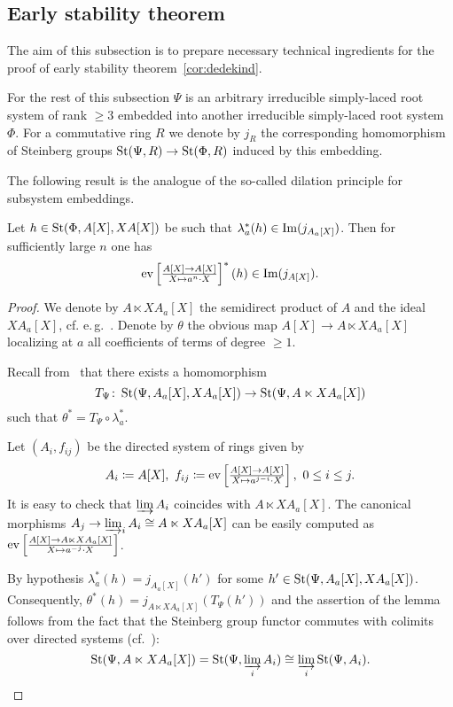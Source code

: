 \subsection{Early stability theorem}
The aim of this subsection is to prepare necessary technical ingredients for the proof of early stability theorem~\cref{cor:dedekind}.

For the rest of this subsection $\Psi$ is an arbitrary irreducible simply-laced root system of rank $\geq 3$ embedded into another irreducible simply-laced root system $\Phi$.
For a commutative ring $R$ we denote by $j_R$ the corresponding homomorphism of Steinberg groups $\operatorname{St}(\Psi, R) \to \operatorname{St}(\Phi, R)$ induced by this embedding.

The following result is the analogue of the so-called dilation principle for subsystem embeddings.
\begin{lemma}\label{lem:dp-2}
Let $h\in\operatorname{St}(\Phi, A[X], X A[X])$ be such that $\lambda_a^*(h) \in \operatorname{Im}(j_{A_a[X]})$.
Then for sufficiently large $n$ one has
\[\mathrm{ev} \textstyle \left[\frac{A[X] \rightarrow A[X]}{X \mapsto a^n\cdot X}\right]^*(h) \in \mathrm{Im}(j_{A[X]}).\]
\end{lemma}
\begin{proof}
 We denote by $A\ltimes XA_a[X]$ the semidirect product of $A$ and the ideal $XA_a[X]$, cf. e.\,g.~\cite[Definition~3.2]{S15}.
 Denote by $\theta$ the obvious map $A[X]\rightarrow A\ltimes XA_a[X]$ localizing at $a$ all coefficients of terms of degree $\geq 1$.

 Recall from~\cite[\S~2]{LS17} that there exists a homomorphism
 \[T_\Psi \colon \operatorname{St}(\Psi, A_a[X], XA_a[X]) \to \operatorname{St}(\Psi, A \ltimes XA_a[X])\]
 such that $\theta^* = T_\Psi \circ \lambda_a^*$.

 Let $(A_i, f_{ij})$ be the directed system of rings given by
 \[A_i\coloneqq A[X],\ f_{ij} \coloneqq \mathrm{ev} \textstyle \left[\frac{A[X] \rightarrow A[X]}{X \mapsto a^{j-i} \cdot X}\right],\ 0 \leq i\leq j.\]
 It is easy to check that $\varinjlim A_i$ coincides with $A \ltimes XA_a[X]$.
 The canonical morphisms $A_j\rightarrow \varinjlim_i A_i \cong A \ltimes XA_a[X]$ can be easily computed as $\mathrm{ev} \textstyle \left[\frac{A[X] \rightarrow A\ltimes XA_a[X]}{X \mapsto a^{-j} \cdot X}\right]$.

 By hypothesis $\lambda_a^*(h) = j_{A_a[X]}(h')$ for some $h' \in \operatorname{St}(\Psi, A_a[X], XA_a[X])$.
 Consequently, $\theta^*(h) = j_{A \ltimes XA_a[X]}(T_\Psi(h'))$
 and the assertion of the lemma follows from the fact that the Steinberg group functor commutes with
  colimits over directed systems (cf.~\cite[Lemma~2.2]{Tu83}):
 \[\operatorname{St}(\Psi, A\ltimes XA_a[X]) = \operatorname{St}(\Psi, \varinjlim_i A_i) \cong \varinjlim_i \operatorname{St}(\Psi,A_i). \qedhere\]
\end{proof}

